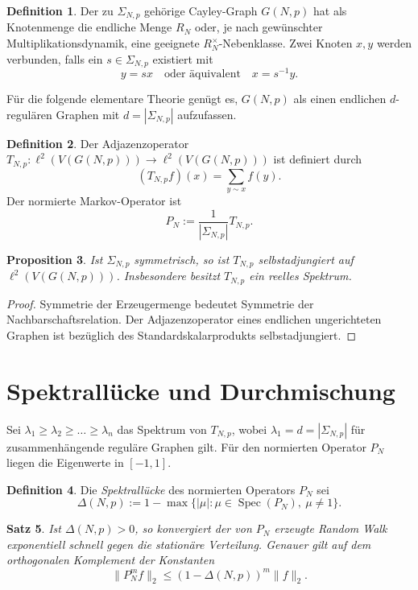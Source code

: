 \documentclass[12pt,a4paper]{article}
\theoremstyle{plain}
\newtheorem{satz}{Satz}[section]
\newtheorem{proposition}[satz]{Proposition}
\theoremstyle{definition}
\newtheorem{definition}[satz]{Definition}
\theoremstyle{remark}
\newcommand{\RN}{R_N}
\newcommand{\SNp}{\Sigma_{N,p}}
\newcommand{\GNp}{G(N,p)}
\newcommand{\TNp}{T_{N,p}}
\newcommand{\PN}{P_N}
\begin{document}
\begin{definition}
Der zu \(\SNp\) gehörige Cayley-Graph \(\GNp\) hat als Knotenmenge die endliche Menge \(\RN\) oder, je nach gewünschter Multiplikationsdynamik, eine geeignete \(\RN^\times\)-Nebenklasse. Zwei Knoten \(x,y\) werden verbunden, falls ein \(s\in \SNp\) existiert mit
\[
 y=sx 
\quad\text{oder äquivalent}\quad
 x=s^{-1}y.
\]
\end{definition}

Für die folgende elementare Theorie genügt es, \(\GNp\) als einen endlichen \(d\)-regulären Graphen mit \(d=|\SNp|\) aufzufassen.

\begin{definition}
Der Adjazenzoperator \(\TNp\colon \ell^2(V(\GNp))\to \ell^2(V(\GNp))\) ist definiert durch
\[
(\TNp f)(x)=\sum_{y\sim x} f(y).
\]
Der normierte Markov-Operator ist
\[
\PN := \frac{1}{|\SNp|}\TNp.
\]
\end{definition}

\begin{proposition}
Ist \(\SNp\) symmetrisch, so ist \(\TNp\) selbstadjungiert auf \(\ell^2(V(\GNp))\). Insbesondere besitzt \(\TNp\) ein reelles Spektrum.
\end{proposition}

\begin{proof}
Symmetrie der Erzeugermenge bedeutet Symmetrie der Nachbarschaftsrelation. Der Adjazenzoperator eines endlichen ungerichteten Graphen ist bezüglich des Standardskalarprodukts selbstadjungiert.
\end{proof}

\section{Spektrallücke und Durchmischung}
Sei \(\lambda_1\ge \lambda_2\ge \dots \ge \lambda_n\) das Spektrum von \(\TNp\), wobei \(\lambda_1=d=|\SNp|\) für zusammenhängende reguläre Graphen gilt. Für den normierten Operator \(\PN\) liegen die Eigenwerte in \([-1,1]\).

\begin{definition}
Die \emph{Spektrallücke} des normierten Operators \(\PN\) sei
\[
\Delta(N,p):=1-\max\{ |\mu| : \mu\in \operatorname{Spec}(\PN),\ \mu\neq 1\}.
\]
\end{definition}

\begin{satz}
Ist \(\Delta(N,p)>0\), so konvergiert der von \(\PN\) erzeugte Random Walk exponentiell schnell gegen die stationäre Verteilung. Genauer gilt auf dem orthogonalen Komplement der Konstanten
\[
\|\PN^m f\|_2 \le (1-\Delta(N,p))^m \|f\|_2.
\]
\end{satz}
\end{document}
